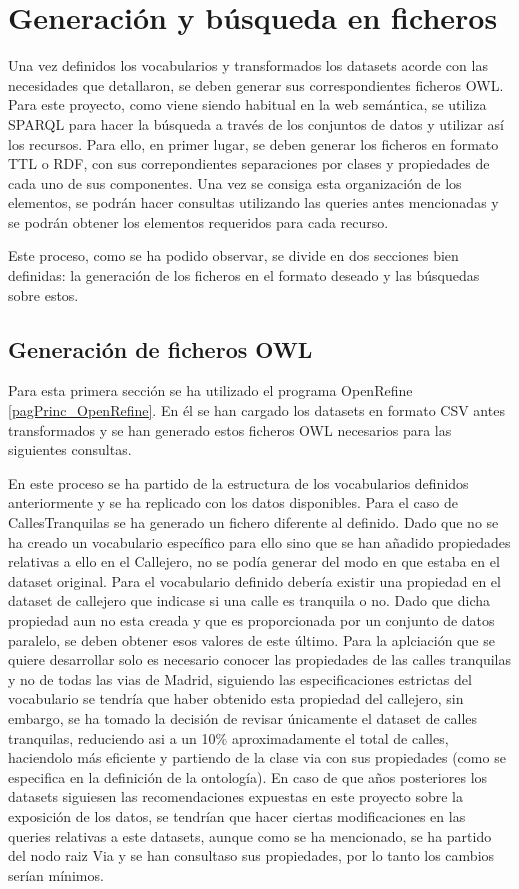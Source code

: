 \chapter{Generación y búsqueda en ficheros}

Una vez definidos los vocabularios y transformados los datasets acorde con las necesidades que detallaron, se deben generar sus correspondientes ficheros OWL.
Para este proyecto, como viene siendo habitual en la web semántica, se utiliza SPARQL para hacer la búsqueda a través de los conjuntos de datos y utilizar así los recursos. Para ello, en primer lugar, se deben generar los ficheros en formato TTL o RDF, con sus correpondientes separaciones por clases y propiedades de cada uno de sus componentes. Una vez se consiga esta organización de los elementos, se podrán hacer consultas utilizando las queries antes mencionadas y se podrán obtener los elementos requeridos para cada recurso.

Este proceso, como se ha podido observar, se divide en dos secciones bien definidas: la generación de los ficheros en el formato deseado y las búsquedas sobre estos.


\section{Generación de ficheros OWL}

Para esta primera sección se ha utilizado el programa OpenRefine \ref{pagPrinc_OpenRefine}. En él se han cargado los datasets en formato CSV antes transformados y se han generado estos ficheros OWL necesarios para las siguientes consultas.

En este proceso se ha partido de la estructura de los vocabularios definidos anteriormente y se ha replicado con los datos disponibles. 
Para el caso de CallesTranquilas se ha generado un fichero diferente al definido. Dado que no se ha creado un vocabulario específico para ello sino que se han añadido propiedades relativas a ello en el Callejero, no se podía generar del modo en que estaba en el dataset original. Para el vocabulario definido debería existir una propiedad en el dataset de callejero que indicase si una calle es tranquila o no. Dado que dicha propiedad aun no esta creada y que es proporcionada por un conjunto de datos paralelo, se deben obtener esos valores de este último. Para la aplciación que se quiere desarrollar solo es necesario conocer las propiedades de las calles tranquilas y no de todas las vias de Madrid, siguiendo las especificaciones estrictas del vocabulario se tendría que haber obtenido esta propiedad del callejero, sin embargo, se ha tomado la decisión de revisar únicamente el dataset de calles tranquilas, reduciendo asi a un 10$\%$ aproximadamente el total de calles, haciendolo más eficiente y partiendo de la clase via con sus propiedades (como se especifica en la definición de la ontología). En caso de que años posteriores los datasets siguiesen las recomendaciones expuestas en este proyecto sobre la exposición de los datos, se tendrían que hacer ciertas modificaciones en las queries relativas a este datasets, aunque como se ha mencionado, se ha partido del nodo raiz Via y se han consultaso sus propiedades, por lo tanto los cambios serían mínimos.

